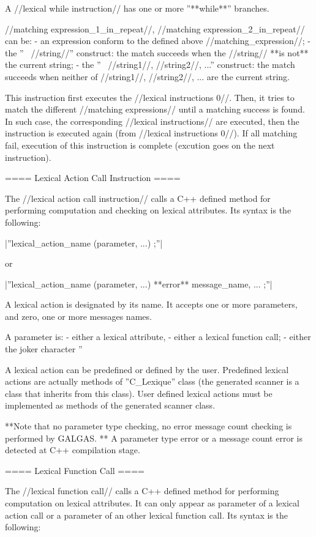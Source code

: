 {A //lexical while instruction// has one or more ''**while**'' branches.

//matching expression\_1\_in\_repeat//, //matching expression\_2\_in\_repeat// can be:
  - an expression conform to the defined above //matching\_expression//;
  - the ''~ //string//'' construct: the match succeeds when the //string// **is not** the current string;
  - the ''~ //string1//, //string2//, ...'' construct: the match succeeds when neither of //string1//, //string2//, ... are the current string.

This instruction first executes the //lexical instructions 0//. Then, it tries to match the different //matching expressions// until a matching success is found. In such case, the corresponding //lexical instructions// are executed, then the instruction is executed again (from //lexical instructions 0//). If all matching fail, execution of this instruction is complete (excution goes on the next instruction).

==== Lexical Action Call Instruction ====

The //lexical action call instruction// calls a C++ defined method for performing computation and checking on lexical attributes. Its syntax is the following:

|''lexical\_action\_name (parameter, ...) ;''|

or

|''lexical\_action\_name (parameter, ...) **error** message\_name, ... ;''|

A lexical action is designated by its name. It accepts one or more parameters, and zero, one or more messages names.

A parameter is:
  - either a lexical attribute,
  - either a lexical function call;
  - either the joker character ''%

A lexical action can be predefined or defined by the user. Predefined lexical actions are actually methods of ''C\_Lexique'' class (the generated scanner is a class that inherits from this class). User defined lexical actions must be implemented as methods of the generated scanner class.

**Note that no parameter type checking, no error message count checking is performed by GALGAS. ** A parameter type error or a message count error is detected at C++ compilation stage.
 
==== Lexical Function Call ====

The //lexical function call// calls a C++ defined method for performing computation on lexical attributes. It can only appear as parameter of a lexical action call or a parameter of an other lexical function call. Its syntax is the following:

}
